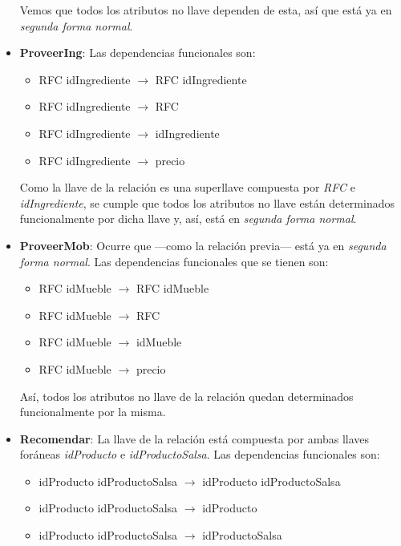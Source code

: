 \documentclass[11pt,letterpaper]{article}
\begin{document}
\begin{itemize}
\begin{itemize}
\end{itemize}

Vemos que todos los atributos no llave dependen de esta, así que está ya en \textit{segunda forma normal}.

\item \textbf{ProveerIng}: Las dependencias funcionales son:

\begin{itemize}
\item RFC idIngrediente $\rightarrow$ RFC idIngrediente

\item RFC idIngrediente $\rightarrow$ RFC 
\item RFC idIngrediente $\rightarrow$ idIngrediente
\item RFC idIngrediente $\rightarrow$ precio
\end{itemize}

Como la llave de la relación es una superllave compuesta por \textit{RFC} e \textit{idIngrediente}, se cumple que todos los atributos no llave están determinados funcionalmente por dicha llave y, así, está en \textit{segunda forma normal}.

\item \textbf{ProveerMob}: Ocurre que ---como la relación previa--- está ya en \textit{segunda forma normal}. Las dependencias funcionales que se tienen son:

\begin{itemize}
\item RFC idMueble $\rightarrow$ RFC idMueble

\item RFC idMueble $\rightarrow$ RFC 
\item RFC idMueble $\rightarrow$ idMueble
\item RFC idMueble $\rightarrow$ precio
\end{itemize}

Así, todos los atributos no llave de la relación quedan determinados funcionalmente por la misma.
\item \textbf{Recomendar}: La llave de la relación está compuesta por ambas llaves foráneas \textit{idProducto} e \textit{idProductoSalsa}. Las dependencias funcionales son:

\begin{itemize}
\item idProducto idProductoSalsa $\rightarrow$ idProducto idProductoSalsa

\item idProducto idProductoSalsa $\rightarrow$ idProducto 
\item idProducto idProductoSalsa $\rightarrow$ idProductoSalsa


\end{itemize}
\end{itemize}
\end{document}
